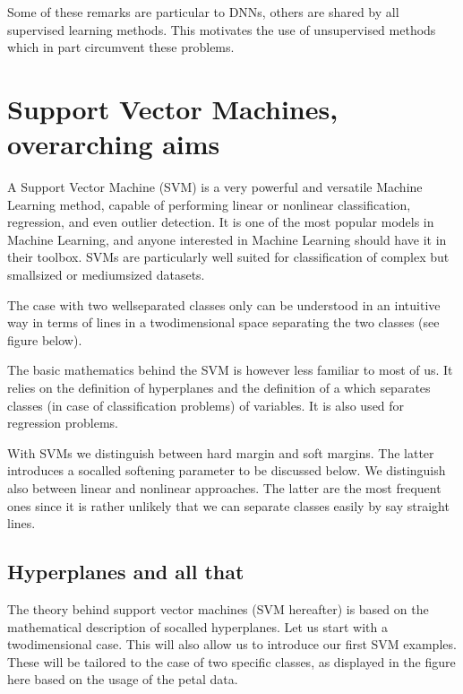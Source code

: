 \documentclass[letterpaper,10pt,english]{sphinxmanual}
\begin{document}
Some of these remarks are particular to DNNs, others are shared by all supervised learning methods. This motivates the use of unsupervised methods which in part circumvent these problems.


\section{Support Vector Machines, overarching aims}
\label{\detokenize{chapter7:support-vector-machines-overarching-aims}}\label{\detokenize{chapter7::doc}}
A Support Vector Machine (SVM) is a very powerful and versatile
Machine Learning method, capable of performing linear or nonlinear
classification, regression, and even outlier detection. It is one of
the most popular models in Machine Learning, and anyone interested in
Machine Learning should have it in their toolbox. SVMs are
particularly well suited for classification of complex but small\sphinxhyphen{}sized or
medium\sphinxhyphen{}sized datasets.

The case with two well\sphinxhyphen{}separated classes only can be understood in an
intuitive way in terms of lines in a two\sphinxhyphen{}dimensional space separating
the two classes (see figure below).

The basic mathematics behind the SVM is however less familiar to most of us.
It relies on the definition of hyperplanes and the
definition of a  which separates classes (in case of
classification problems) of variables. It is also used for regression
problems.

With SVMs we distinguish between hard margin and soft margins. The
latter introduces a so\sphinxhyphen{}called softening parameter to be discussed
below.  We distinguish also between linear and non\sphinxhyphen{}linear
approaches. The latter are the most frequent ones since it is rather
unlikely that we can separate classes easily by say straight lines.


\subsection{Hyperplanes and all that}
\label{\detokenize{chapter7:hyperplanes-and-all-that}}
The theory behind support vector machines (SVM hereafter) is based on
the mathematical description of so\sphinxhyphen{}called hyperplanes. Let us start
with a two\sphinxhyphen{}dimensional case. This will also allow us to introduce our
first SVM examples. These will be tailored to the case of two specific
classes, as displayed in the figure here based on the usage of the petal data.
\end{document}
